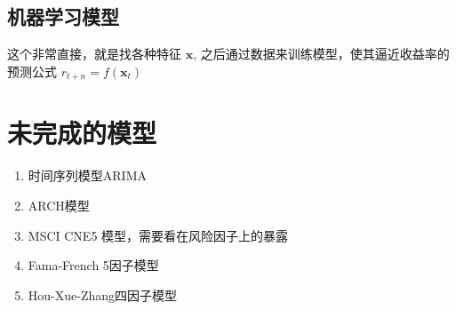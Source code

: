 \documentclass[11pt,oneside,a4paper,notitlepage]{article}
\newcommand{\vect}[1]{\mathbf{#1}}
\begin{document}
\begin{CJK}{UTF8}{gbsn}
\subsection{机器学习模型}
这个非常直接，就是找各种特征 $\vect x$, 之后通过数据来训练模型，使其逼近收益率的预测公式 $r_{t+n} = f(\vect x_t)$

\section{未完成的模型}
\begin{enumerate}
    \item 时间序列模型ARIMA
    \item ARCH模型
    \item MSCI CNE5 模型，需要看在风险因子上的暴露
    \item Fama-French 5因子模型
    \item Hou-Xue-Zhang四因子模型
\end{enumerate}


\end{CJK}
\end{document}

